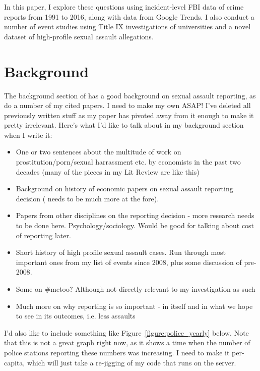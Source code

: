 \documentclass[AER,draftmode]{AEA}
\begin{document}
In this paper, I explore these questions using incident-level FBI data of crime reports from 1991 to 2016, along with data from Google Trends. I also conduct a number of event studies using Title IX investigations of universities and a novel dataset of high-profile sexual assault allegations. 

\section{Background}

The background section of \cite{lindo_college_2018} has a good background on sexual assault reporting, as do a number of my cited papers. I need to make my own ASAP! I've deleted all previously written stuff as my paper has pivoted away from it enough to make it pretty irrelevant. Here's what I'd like to talk about in my background section when I write it:

\begin{itemize}
    \item One or two sentences about the multitude of work on prostitution/porn/sexual harrassment etc. by economists in the past two decades (many of the pieces in my Lit Review are like this)
    \item Background on history of economic papers on sexual assault reporting decision ( needs to be much more at the fore). 
    \item Papers from other disciplines on the reporting decision - more research needs to be done here. Psychology/sociology. Would be good for talking about cost of reporting later.
    \item Short history of high profile sexual assault cases. Run through most important ones from my list of events since 2008, plus some discussion of pre-2008.
    \item Some on #metoo? Although not directly relevant to my investigation as such
    \item Much more on why reporting is so important - in itself and in what we hope to see in its outcomes, i.e. less assaults
\end{itemize}

I'd also like to include something like Figure~\ref{figure:police_yearly} below. Note that this is not a great graph right now, as it shows a time when the number of police stations reporting these numbers was increasing. I need to make it per-capita, which will just take a re-jigging of my code that runs on the server. 
\end{document}
